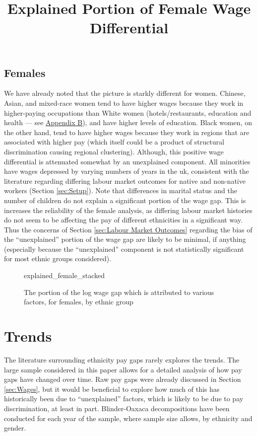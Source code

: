 \documentclass[class=article, crop=false]{standalone}
\begin{document}
\subsection{Females}
\label{sec:females_explained}
We have already noted that the picture is starkly different for women. Chinese, Asian, and mixed-race women tend to have higher wages because they work in higher-paying occupations than White women (hotels/restaurants, education and health --- see \hyperref[sec:appendixB]{Appendix B}), and have higher levels of education. Black women, on the other hand, tend to have higher wages because they work in regions that are associated with higher pay (which itself could be a product of structural discrimination causing regional clustering). Although, this positive wage differential is attenuated somewhat by an unexplained component. All minorities have wages depressed by varying numbers of years in the \acrshort{uk}, consistent with the literature regarding differing labour market outcomes for native and non-native workers (Section \ref{sec:Setup}). Note that differences in marital status and the number of children do not explain a significant portion of the wage gap. This is increases the reliability of the female analysis, as differing labour market histories do not seem to be affecting the pay of different ethnicities in a significant way. Thus the concerns of Section \ref{sec:Labour Market Outcomes} regarding the bias of the \enquote{unexplained} portion of the wage gap are likely to be minimal, if anything (especially because the \enquote{unexplained} component is not statistically significant for most ethnic groups considered).

\begin{figure}[]
\centering
    \title{Explained Portion of Female Wage Differential}
    {explained_female_stacked}
    \caption{The portion of the log wage gap which is attributed to various factors, for females, by ethnic group}
    \label{fig:explained_female_stacked}
\end{figure}

\section{Trends}
\label{sec:time_trends}
The literature surrounding ethnicity pay gaps rarely explores the trends. The large sample considered in this paper allows for a detailed analysis of how pay gaps have changed over time. Raw pay gaps were already discussed in Section \ref{sec:Wages}, but it would be beneficial to explore how much of this has historically been due to \enquote{unexplained} factors, which is likely to be due to pay discrimination, at least in part. Blinder-Oaxaca decompositions have been conducted for each year of the sample, where sample size allows, by ethnicity and gender.
\end{document}
